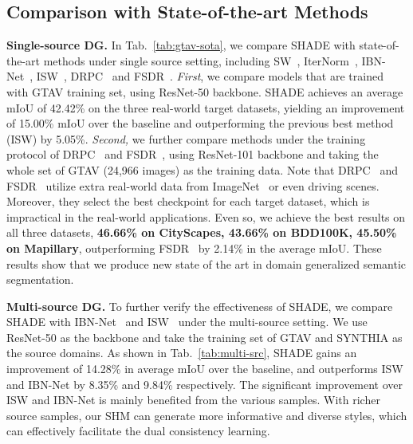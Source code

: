 \documentclass[runningheads]{llncs}
\newcommand{\ours}{SHADE\xspace}
\begin{document}
\subsection{Comparison with State-of-the-art Methods}

\noindent\textbf{Single-source DG.}
In Tab.~\ref{tab:gtav-sota}, we compare \ours with state-of-the-art methods under single source setting, including SW~\cite{pan2019switchable}, IterNorm~\cite{huang2019iterative}, IBN-Net~\cite{ibn}, ISW~\cite{robustnet}, DRPC~\cite{DRPC} and FSDR~\cite{FSDR}.
\textit{First}, we compare models that are trained with GTAV training set, using ResNet-50 backbone. \ours achieves an average mIoU of 42.42\% on the three real-world target datasets, yielding an improvement of 15.00\% mIoU over the baseline and outperforming the previous best method (ISW) by 5.05\%.
\textit{Second,} we further compare methods under the training protocol of DRPC~\cite{DRPC} and FSDR~\cite{FSDR}, using ResNet-101 backbone and taking the whole set of GTAV (24,966 images) as the training data. 
Note that DRPC~\cite{DRPC} and FSDR~\cite{FSDR} utilize extra real-world data from ImageNet~\cite{imagenet} or even driving scenes. Moreover, they select the best checkpoint for each target dataset, which is impractical in the real-world applications. 
Even so, we achieve the best results on all three datasets, \textbf{46.66\% on CityScapes, 43.66\% on BDD100K, 45.50\% on Mapillary}, outperforming FSDR~\cite{FSDR} by 2.14\% in the average mIoU. These results show that we produce new state of the art in domain generalized semantic segmentation.


\noindent\textbf{Multi-source DG.} To further verify the effectiveness of \ours, we compare \ours with IBN-Net~\cite{ibn} and ISW~\cite{robustnet} under the multi-source setting.
We use ResNet-50 as the backbone and take the training set of GTAV and SYNTHIA as the source domains. As shown in Tab.~\ref{tab:multi-src}, \ours gains an improvement of 14.28\% in average mIoU over the baseline, and outperforms ISW and IBN-Net by 8.35\% and 9.84\% respectively. 
The significant improvement over ISW and IBN-Net is mainly benefited from the various samples. With richer source samples, our SHM can generate more informative and diverse styles, which can effectively facilitate the dual consistency learning.
\end{document}
